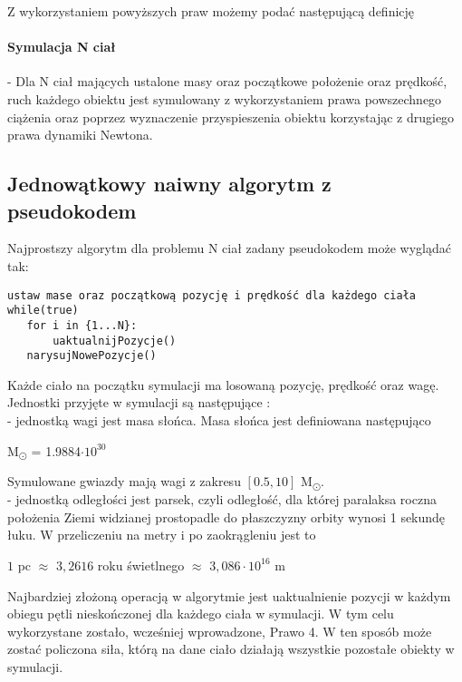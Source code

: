 \documentclass[14pt,twoside,a4paper]{article}
\begin{document}
Z wykorzystaniem powyższych praw możemy podać następującą definicję
\paragraph{Symulacja N ciał} -  Dla N ciał mających ustalone masy oraz początkowe położenie oraz prędkość, ruch każdego obiektu jest symulowany z wykorzystaniem prawa powszechnego ciążenia oraz poprzez wyznaczenie przyspieszenia obiektu korzystając z drugiego prawa dynamiki Newtona.

\subsection{\Large Jednowątkowy naiwny algorytm z pseudokodem}

Najprostszy algorytm dla problemu N ciał zadany pseudokodem może wyglądać tak:\\


\begin{lstlisting}[frame=single, framerule=2pt, caption=pseudokod]
ustaw mase oraz początkową pozycję i prędkość dla każdego ciała
while(true)
   for i in {1...N}:
       uaktualnijPozycje()
   narysujNowePozycje()
\end{lstlisting}


Każde ciało na początku symulacji ma losowaną pozycję, prędkość oraz wagę. Jednostki przyjęte w symulacji są następujące : \\
- jednostką wagi jest masa słońca. Masa słońca jest definiowana następująco\\
\begin{center}
M\textsubscript{\(\odot\)} = 1.9884\(\cdot 10^{30}\)\\
\end{center}
Symulowane gwiazdy mają wagi z zakresu \([0.5, 10]\) M\textsubscript{\(\odot\)}.\\
- jednostką odległości jest parsek, czyli odległość, dla której paralaksa roczna położenia Ziemi widzianej prostopadle do płaszczyzny orbity wynosi 1 sekundę łuku. W przeliczeniu na metry i po zaokrągleniu jest to 
\begin{center}
\(1\) pc \(\approx\) \(3,2616\) roku świetlnego \(\approx\) \(3,086\cdot 10^{16}\) m\\
\end{center}
Najbardziej złożoną operacją w algorytmie jest uaktualnienie pozycji w każdym obiegu pętli nieskończonej dla każdego ciała w symulacji. W tym celu wykorzystane zostało, wcześniej wprowadzone, Prawo 4. W ten sposób może zostać policzona siła, którą na dane ciało działają wszystkie pozostałe obiekty w symulacji. 
\end{document}

